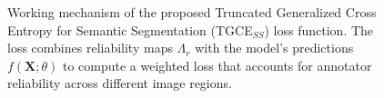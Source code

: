 \begin{figure}[t]
  \caption{Working mechanism of the proposed Truncated Generalized
    Cross Entropy for Semantic Segmentation (TGCE$_{SS}$) loss
    function. The loss combines reliability maps $\Lambda_r$ with the
    model's predictions $f(\mathbf{X};\theta)$ to compute a weighted
  loss that accounts for annotator reliability across different image regions.}
  \label{fig:loss_mechanism}
\end{figure}